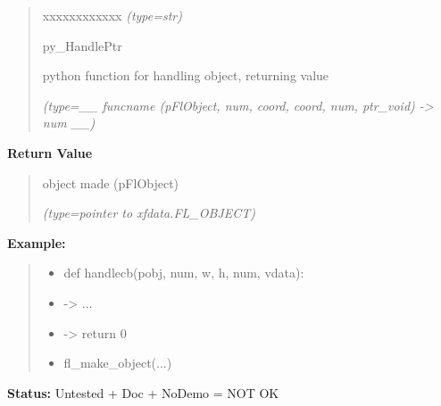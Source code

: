 \begin{boxedminipage}{\funcwidth}
\begin{quote}
\begin{Ventry}{xxxxxxxxxxxx}
            {\it (type=str)}

          \item[py\_HandlePtr]

          python function for handling object, returning value

            {\it (type=\_\_ funcname (pFlObject, num, coord, coord, num, ptr\_void) 
-{\textgreater} num \_\_)}

        \end{Ventry}

      \end{quote}

      \textbf{Return Value}
    \vspace{-1ex}

      \begin{quote}
      object made (pFlObject)

      {\it (type=pointer to xfdata.FL\_OBJECT)}

      \end{quote}

\textbf{Example:}
\begin{quote}
  \begin{itemize}

  \item
    \setlength{\parskip}{0.6ex}
def handlecb(pobj, num, w, h, num, vdata):



  \item {\textbar}-{\textgreater}{\textbar} ...



  \item {\textbar}-{\textgreater}{\textbar} return 0



  \item fl\_make\_object(...)



\end{itemize}

\end{quote}

\textbf{Status:} Untested + Doc + NoDemo = NOT OK



    \end{boxedminipage}

    \label{xformslib:flbasic:fl_add_child}

